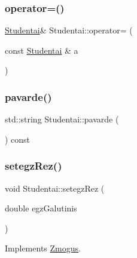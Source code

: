 \subsubsection{\texorpdfstring{operator=()}{operator=()}}
{\footnotesize\ttfamily \mbox{\hyperlink{class_studentai}{Studentai}}\& Studentai\+::operator= (\begin{DoxyParamCaption}\item[{const \mbox{\hyperlink{class_studentai}{Studentai}} \&}]{a }\end{DoxyParamCaption})\hspace{0.3cm}{\ttfamily [inline]}}

\mbox{\label{class_studentai_af77caf5768840f5660954fbe64745efa}} 
\subsubsection{\texorpdfstring{pavarde()}{pavarde()}}
{\footnotesize\ttfamily std\+::string Studentai\+::pavarde (\begin{DoxyParamCaption}{ }\end{DoxyParamCaption}) const\hspace{0.3cm}{\ttfamily [inline]}}

\mbox{\label{class_studentai_ad4979b0c6137e0ce9edad1d609bed522}} 
\subsubsection{\texorpdfstring{setegzRez()}{setegzRez()}}
{\footnotesize\ttfamily void Studentai\+::setegz\+Rez (\begin{DoxyParamCaption}\item[{double}]{egz\+Galutinis }\end{DoxyParamCaption})\hspace{0.3cm}{\ttfamily [virtual]}}



Implements \mbox{\hyperlink{class_zmogus_a19656beb88d5e73a65ceef8c68e191c4}{Zmogus}}.

\mbox{\label{class_studentai_a54ec3efbba483b0184c0fe3eafe40b67}} 
